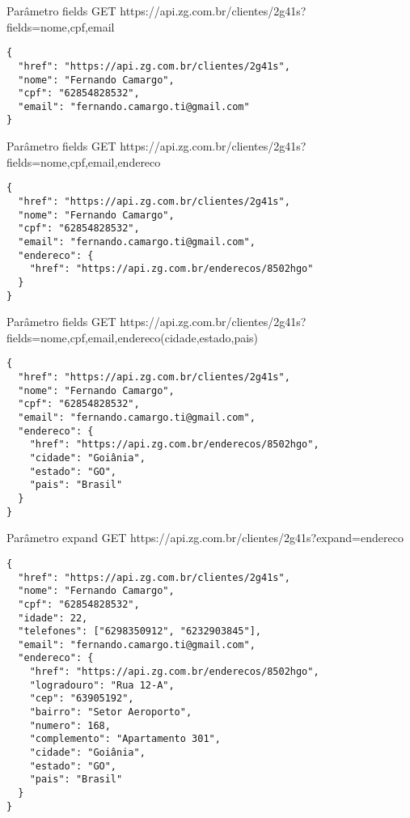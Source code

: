\documentclass{beamer}
\begin{document}
\begin{frame}[fragile]{Parâmetro \alert{fields}}
  GET https://api.zg.com.br/clientes/2g41s?
  \alert{fields}=nome,cpf,email
  \begin{verbatim}
{
  "href": "https://api.zg.com.br/clientes/2g41s",
  "nome": "Fernando Camargo",
  "cpf": "62854828532",
  "email": "fernando.camargo.ti@gmail.com"
}
  \end{verbatim}
\end{frame}

\begin{frame}[fragile]{Parâmetro \alert{fields}}
  GET https://api.zg.com.br/clientes/2g41s?
  \alert{fields}=nome,cpf,email,endereco
  \begin{verbatim}
{
  "href": "https://api.zg.com.br/clientes/2g41s",
  "nome": "Fernando Camargo",
  "cpf": "62854828532",
  "email": "fernando.camargo.ti@gmail.com",
  "endereco": {
    "href": "https://api.zg.com.br/enderecos/8502hgo"
  }
}
  \end{verbatim}
\end{frame}

\begin{frame}[fragile]{Parâmetro \alert{fields}}
  GET https://api.zg.com.br/clientes/2g41s?
  \alert{fields}=nome,cpf,email,\alert{endereco(cidade,estado,pais)}
  \begin{verbatim}
{
  "href": "https://api.zg.com.br/clientes/2g41s",
  "nome": "Fernando Camargo",
  "cpf": "62854828532",
  "email": "fernando.camargo.ti@gmail.com",
  "endereco": {
    "href": "https://api.zg.com.br/enderecos/8502hgo",
    "cidade": "Goiânia",
    "estado": "GO",
    "pais": "Brasil"
  }
}
  \end{verbatim}
\end{frame}

\begin{frame}[fragile]{Parâmetro \alert{expand}}
  GET https://api.zg.com.br/clientes/2g41s?\alert{expand}=endereco
  \begin{verbatim}
{
  "href": "https://api.zg.com.br/clientes/2g41s",
  "nome": "Fernando Camargo",
  "cpf": "62854828532",
  "idade": 22,
  "telefones": ["6298350912", "6232903845"],
  "email": "fernando.camargo.ti@gmail.com",
  "endereco": {
    "href": "https://api.zg.com.br/enderecos/8502hgo",
    "logradouro": "Rua 12-A",
    "cep": "63905192",
    "bairro": "Setor Aeroporto",
    "numero": 168,
    "complemento": "Apartamento 301",
    "cidade": "Goiânia",
    "estado": "GO",
    "pais": "Brasil"
  }
}
  \end{verbatim}
\end{frame}
\end{document}
